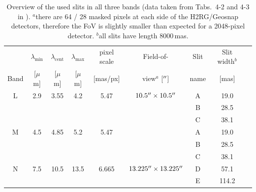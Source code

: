 \begin{table}
\centering
\begin{tabular}{c|ccc|c:c|ccc}
     & $\lambda_\textrm{min}$ & $\lambda_\textrm{cent}$ & $\lambda_\textrm{max}$ & pixel scale & Field-of-       & Slit & Slit width$^b$        &\\
Band & [$\mu$m]               & [$\mu$m]                & [$\mu$m]               & [mas/px] & view$^a$ [$\hbox{$^{\prime\prime}$}$] & name &  [mas] & \\
\hline
L & 2.9 & 3.55 & 4.2  & 5.47 & $10.5\hbox{$^{\prime\prime}$}\times10.5\hbox{$^{\prime\prime}$}$ & A & 19.0  & \\
  &     &      &      &      & & B & 28.5  & \\
  &     &      &      &      & & C & 38.1  & \\
\hdashline
M & 4.5 & 4.85 & 5.2  & 5.47 & & A & 19.0  & \\
  &     &      &      &      & & B & 28.5  & \\
  &     &      &      &      & & C & 38.1  & \\
\hdashline
N & 7.5 & 10.5 & 13.5 & 6.665 &$13.225\hbox{$^{\prime\prime}$}\times13.225\hbox{$^{\prime\prime}$}$ & D & 57.1   &  \\
  &     &      &      &       & & E & 114.2  &  \\
\end{tabular}
\caption{Overview of the used slits in all three bands (data taken from Tabs.~4-2 and 4-3 in \cite{METIS-system_analysis}\label{tab:slit_props}).
\newline $^a$there are 64 / 28 masked pixels at each side of the H2RG/Geosnap detectors, therefore the \ac{FoV} is slightly smaller than expected for a 2048-pixel detector.
\newline $^b$all slits have length 8000\,mas.}
\end{table}

